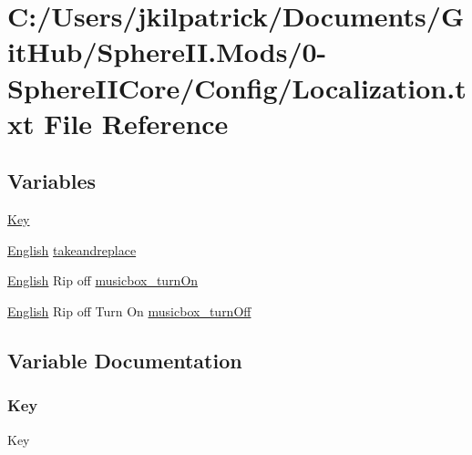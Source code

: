\hypertarget{0-_sphere_i_i_core_2_config_2_localization_8txt}{}\section{C\+:/\+Users/jkilpatrick/\+Documents/\+Git\+Hub/\+Sphere\+II.Mods/0-\/\+Sphere\+I\+I\+Core/\+Config/\+Localization.txt File Reference}
\label{0-_sphere_i_i_core_2_config_2_localization_8txt}
\subsection*{Variables}
\begin{DoxyCompactItemize}
\item 
\mbox{\hyperlink{0-_sphere_i_i_core_2_config_2_localization_8txt_ab3c7af4820830f9166ede9e5623c4e73}{Key}}
\item 
\mbox{\hyperlink{_sphere_i_i_01_winter_01_project_2_config_2_localization_8txt_ad896b63205779b1b09e86d941ce13976}{English}} \mbox{\hyperlink{0-_sphere_i_i_core_2_config_2_localization_8txt_a13d9a96b6e226395d376e176ba71e5bc}{takeandreplace}}
\item 
\mbox{\hyperlink{_sphere_i_i_01_winter_01_project_2_config_2_localization_8txt_ad896b63205779b1b09e86d941ce13976}{English}} Rip off \mbox{\hyperlink{0-_sphere_i_i_core_2_config_2_localization_8txt_aa0be4f08c7c98f1709fdd767f487560f}{musicbox\+\_\+turn\+On}}
\item 
\mbox{\hyperlink{_sphere_i_i_01_winter_01_project_2_config_2_localization_8txt_ad896b63205779b1b09e86d941ce13976}{English}} Rip off Turn On \mbox{\hyperlink{0-_sphere_i_i_core_2_config_2_localization_8txt_abfaa31b1d849aeaf4567421bbd916aa4}{musicbox\+\_\+turn\+Off}}
\end{DoxyCompactItemize}


\subsection{Variable Documentation}
\mbox{\label{0-_sphere_i_i_core_2_config_2_localization_8txt_ab3c7af4820830f9166ede9e5623c4e73}} 
\subsubsection{\texorpdfstring{Key}{Key}}
{\footnotesize\ttfamily Key}



